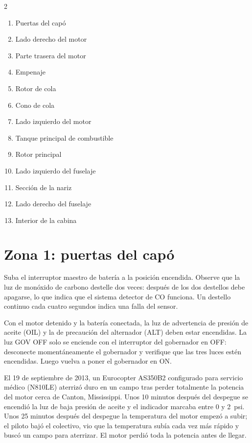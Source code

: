 \begin{multicols}{2}
\begin{enumerate}\small
\item Puertas del capó
\item Lado derecho del motor
\item Parte trasera del motor
\item Empenaje
\item Rotor de cola
\item Cono de cola
\item Lado izquierdo del motor
\item Tanque principal de combustible
\item Rotor principal
\item Lado izquierdo del fuselaje
\item Sección de la nariz
\item Lado derecho del fuselaje
\item Interior de la cabina
\end{enumerate}
\end{multicols}

\section{Zona 1: puertas del capó}

Suba el interruptor maestro de batería a la posición encendida. Observe que la luz de monóxido de carbono destelle dos veces: después de los dos destellos debe apagarse, lo que indica que el sistema detector de CO funciona. Un destello continuo cada cuatro segundos indica una falla del sensor.

Con el motor detenido y la batería conectada, la luz de advertencia de presión de aceite (\textsf{OIL}) y la de precaución del alternador (\textsf{ALT}) deben estar encendidas. La luz \textsf{GOV OFF} solo se enciende con el interruptor del gobernador en OFF: desconecte momentáneamente el gobernador y verifique que las tres luces estén encendidas. Luego vuelva a poner el gobernador en ON.

\begin{caso}
El 19 de septiembre de 2013, un Eurocopter AS350B2 configurado para servicio médico (N810LE) aterrizó duro en un campo tras perder totalmente la potencia del motor cerca de Canton, Mississippi. Unos 10 minutos después del despegue se encendió la luz de baja presión de aceite y el indicador marcaba entre 0 y 2~psi. Unos 25 minutos después del despegue la temperatura del motor empezó a subir; el piloto bajó el colectivo, vio que la temperatura subía cada vez más rápido y buscó un campo para aterrizar. El motor perdió toda la potencia antes de llegar.
\end{caso}

